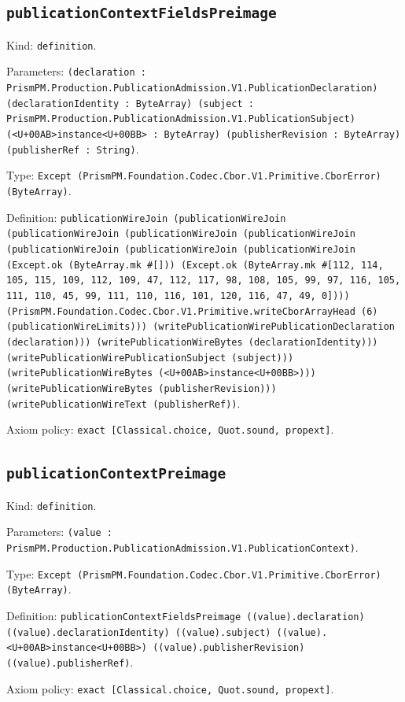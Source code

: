 \documentclass[11pt]{article}
\begin{document}
\subsection*{\texttt{publicationContextFieldsPreimage}}
\noindent Kind: \texttt{definition}.\par
\noindent Parameters: \texttt{(declaration : PrismPM.Production.PublicationAdmission.V1.PublicationDeclaration) (declarationIdentity : ByteArray) (subject : PrismPM.Production.PublicationAdmission.V1.PublicationSubject) (<U+00AB>instance<U+00BB> : ByteArray) (publisherRevision : ByteArray) (publisherRef : String)}.\par
\noindent Type: \texttt{Except (PrismPM.Foundation.Codec.Cbor.V1.Primitive.CborError) (ByteArray)}.\par
\noindent Definition: \texttt{publicationWireJoin (publicationWireJoin (publicationWireJoin (publicationWireJoin (publicationWireJoin (publicationWireJoin (publicationWireJoin (publicationWireJoin (Except.ok (ByteArray.mk \#[])) (Except.ok (ByteArray.mk \#[112, 114, 105, 115, 109, 112, 109, 47, 112, 117, 98, 108, 105, 99, 97, 116, 105, 111, 110, 45, 99, 111, 110, 116, 101, 120, 116, 47, 49, 0]))) (PrismPM.Foundation.Codec.Cbor.V1.Primitive.writeCborArrayHead (6) (publicationWireLimits))) (writePublicationWirePublicationDeclaration (declaration))) (writePublicationWireBytes (declarationIdentity))) (writePublicationWirePublicationSubject (subject))) (writePublicationWireBytes (<U+00AB>instance<U+00BB>))) (writePublicationWireBytes (publisherRevision))) (writePublicationWireText (publisherRef))}.\par
\noindent Axiom policy: \texttt{exact [Classical.choice, Quot.sound, propext]}.\par
\subsection*{\texttt{publicationContextPreimage}}
\noindent Kind: \texttt{definition}.\par
\noindent Parameters: \texttt{(value : PrismPM.Production.PublicationAdmission.V1.PublicationContext)}.\par
\noindent Type: \texttt{Except (PrismPM.Foundation.Codec.Cbor.V1.Primitive.CborError) (ByteArray)}.\par
\noindent Definition: \texttt{publicationContextFieldsPreimage ((value).declaration) ((value).declarationIdentity) ((value).subject) ((value).<U+00AB>instance<U+00BB>) ((value).publisherRevision) ((value).publisherRef)}.\par
\noindent Axiom policy: \texttt{exact [Classical.choice, Quot.sound, propext]}.\par
\end{document}
